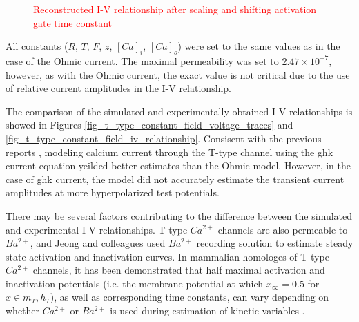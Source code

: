 \documentclass[../main.tex]{subfiles}
\begin{document}
\begin{figure}[!t]
\begin{subfigure}[t]{0.45\textwidth}
        \caption{}
        \label{fig_t_type_constant_field_iv_relationship_scaled}
    \end{subfigure}
    
    \caption{\textcolor{red}{Reconstructed I-V relationship after scaling and shifting activation gate time constant}}
    \label{fig_t_type_voltage_step_ohmic_vs_constant_field_scaled}
\end{figure}

All constants ($R$, $T$, $F$, $z$, $[Ca]_i$, $[Ca]_o$) were set to the same values as in the case of the Ohmic current. The maximal permeability was set to $2.47\times10^{-7}$, however, as with the Ohmic current, the exact value is not critical due to the use of relative current amplitudes in the I-V relationship.

The comparison of the simulated and experimentally obtained I-V relationships is showed in Figures \ref{fig_t_type_constant_field_voltage_traces} and \ref{fig_t_type_constant_field_iv_relationship}. Consisent with the previous reports \parencite{huguenardSimulationCurrentsInvolved1992}, modeling calcium current through the T-type channel using the \gls{ghk} current equation yeilded better estimates than the Ohmic model. However, in the case of \gls{ghk} current, the model did not accurately estimate the transient current amplitudes at more hyperpolarized test potentials.

There may be several factors contributing to the difference between the simulated and experimental I-V relationships. T-type $Ca^{2+}$ channels are also permeable to $Ba^{2+}$, and Jeong and colleagues used $Ba^{2+}$ recording solution to estimate steady state activation and inactivation curves.
In mammalian homologes of T-type $Ca^{2+}$ channels, it has been demonstrated that half maximal activation and inactivation potentials (i.e. the membrane potential at which $x_{\infty}=0.5$ for $x\in {m_T, h_T}$), as well as corresponding time constants, can vary depending on whether $Ca^{2+}$ or $Ba^{2+}$ is used during estimation of kinetic variables \parencite{khanPermeationGatingCaV312008}.
\end{document}
